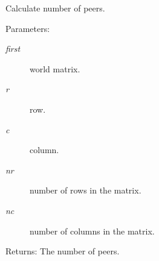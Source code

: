 Calculate number of peers. \begin{Desc}
\item[Parameters:]
\begin{description}
\item[{\em first}]world matrix. \item[{\em r}]row. \item[{\em c}]column. \item[{\em nr}]number of rows in the matrix. \item[{\em nc}]number of columns in the matrix. \end{description}
\end{Desc}
\begin{Desc}
\item[Returns:]The number of peers. \end{Desc}
